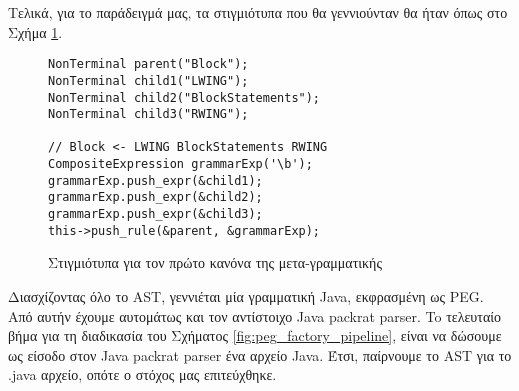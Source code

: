 Τελικά, για το παράδειγμά μας, τα στιγμιότυπα που θα γεννιούνταν θα ήταν όπως στο Σχήμα \ref{fig:objects_seq_example}.

\begin{figure}[h]
\setlength\partopsep{-\topsep}%
\begin{verbatim}
NonTerminal parent("Block");
NonTerminal child1("LWING");
NonTerminal child2("BlockStatements");
NonTerminal child3("RWING");

// Block <- LWING BlockStatements RWING
CompositeExpression grammarExp('\b');
grammarExp.push_expr(&child1);
grammarExp.push_expr(&child2);
grammarExp.push_expr(&child3);
this->push_rule(&parent, &grammarExp);
\end{verbatim}
\caption{Στιγμιότυπα για τον πρώτο κανόνα της μετα-γραμματικής}
\label{fig:objects_seq_example}
\end{figure}

Διασχίζοντας όλο το AST, γεννιέται μία γραμματική Java, εκφρασμένη ως PEG.
Από αυτήν έχουμε αυτομάτως και τον αντίστοιχο Java packrat parser.
To τελευταίο βήμα για  τη διαδικασία του Σχήματος \ref{fig:peg_factory_pipeline}, είναι να δώσουμε ως είσοδο στον Java packrat parser ένα αρχείο Java.
Έτσι, παίρνουμε το AST για το .java αρχείο, οπότε ο στόχος μας επιτεύχθηκε.
